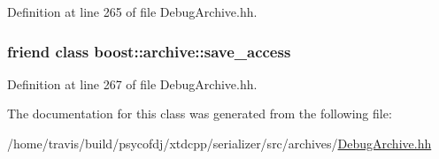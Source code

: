 Definition at line 265 of file Debug\-Archive.\-hh.

\hypertarget{classxtd_1_1serializer_1_1DebugBinIArchive_aaca003bb8a4fc59424e4025130da4edd}{
\subsubsection[{boost\-::archive\-::save\-\_\-access}]{\setlength{\rightskip}{0pt plus 5cm}friend class boost\-::archive\-::save\-\_\-access\hspace{0.3cm}{\ttfamily [friend]}}}\label{classxtd_1_1serializer_1_1DebugBinIArchive_aaca003bb8a4fc59424e4025130da4edd}


Definition at line 267 of file Debug\-Archive.\-hh.



The documentation for this class was generated from the following file\-:\begin{DoxyCompactItemize}
\item 
/home/travis/build/psycofdj/xtdcpp/serializer/src/archives/\hyperlink{DebugArchive_8hh}{Debug\-Archive.\-hh}\end{DoxyCompactItemize}
